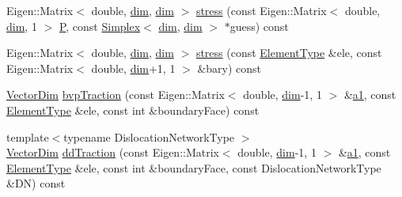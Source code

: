 \begin{DoxyCompactItemize}
\item 
Eigen\+::\+Matrix$<$ double, \hyperlink{plot_nd_a_8m_a382f3ca768b275b8d563604f7fc7df73}{dim}, \hyperlink{plot_nd_a_8m_a382f3ca768b275b8d563604f7fc7df73}{dim} $>$ \hyperlink{classmodel_1_1_b_v_psolver_ad22417704a0d668d9a8ecb5eb809ca95}{stress} (const Eigen\+::\+Matrix$<$ double, \hyperlink{plot_nd_a_8m_a382f3ca768b275b8d563604f7fc7df73}{dim}, 1 $>$ \hyperlink{_f_e_m_2linear__elasticity__3d_2tetgen_2generate_p_o_l_ycube_8m_a50a9afb44201a65ab7ad5feb2150aeb6}{P}, const \hyperlink{classmodel_1_1_simplex}{Simplex}$<$ \hyperlink{plot_nd_a_8m_a382f3ca768b275b8d563604f7fc7df73}{dim}, \hyperlink{plot_nd_a_8m_a382f3ca768b275b8d563604f7fc7df73}{dim} $>$ $\ast$guess) const 
\item 
Eigen\+::\+Matrix$<$ double, \hyperlink{plot_nd_a_8m_a382f3ca768b275b8d563604f7fc7df73}{dim}, \hyperlink{plot_nd_a_8m_a382f3ca768b275b8d563604f7fc7df73}{dim} $>$ \hyperlink{classmodel_1_1_b_v_psolver_a6102c4a94f403d5beb0ab27845b4a0a5}{stress} (const \hyperlink{classmodel_1_1_b_v_psolver_ae2e9c254c6f06d0217b460e184f1dbc0}{Element\+Type} \&ele, const Eigen\+::\+Matrix$<$ double, \hyperlink{plot_nd_a_8m_a382f3ca768b275b8d563604f7fc7df73}{dim}+1, 1 $>$ \&bary) const 
\item 
\hyperlink{classmodel_1_1_b_v_psolver_a5fb720fa6675fefac0f86f15a5104562}{Vector\+Dim} \hyperlink{classmodel_1_1_b_v_psolver_aa8c4c86240b5cc1c0abe900aab6a53f9}{bvp\+Traction} (const Eigen\+::\+Matrix$<$ double, \hyperlink{plot_nd_a_8m_a382f3ca768b275b8d563604f7fc7df73}{dim}-\/1, 1 $>$ \&\hyperlink{run_multipole_8m_a8dbb40f7f7bb5a67b98c95563ac0f086}{a1}, const \hyperlink{classmodel_1_1_b_v_psolver_ae2e9c254c6f06d0217b460e184f1dbc0}{Element\+Type} \&ele, const int \&boundary\+Face) const 
\item 
{\footnotesize template$<$typename Dislocation\+Network\+Type $>$ }\\\hyperlink{classmodel_1_1_b_v_psolver_a5fb720fa6675fefac0f86f15a5104562}{Vector\+Dim} \hyperlink{classmodel_1_1_b_v_psolver_a454a1be0bcfbbe53167a6420f3587aaa}{dd\+Traction} (const Eigen\+::\+Matrix$<$ double, \hyperlink{plot_nd_a_8m_a382f3ca768b275b8d563604f7fc7df73}{dim}-\/1, 1 $>$ \&\hyperlink{run_multipole_8m_a8dbb40f7f7bb5a67b98c95563ac0f086}{a1}, const \hyperlink{classmodel_1_1_b_v_psolver_ae2e9c254c6f06d0217b460e184f1dbc0}{Element\+Type} \&ele, const int \&boundary\+Face, const Dislocation\+Network\+Type \&D\+N) const 
\end{DoxyCompactItemize}

